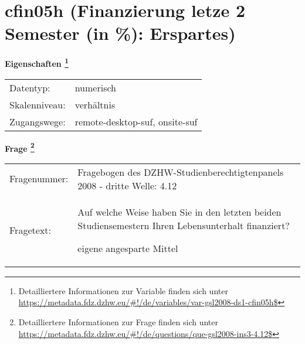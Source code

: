 
    \setcounter{footnote}{0}

    \vspace*{-1.8cm}
	\section{cfin05h (Finanzierung letze 2 Semester (in \%): Erspartes)}
	\label{section:cfin05h}



    \vspace*{0.5cm}
    \noindent\textbf{Eigenschaften
	\footnote{Detailliertere Informationen zur Variable finden sich unter
		\url{https://metadata.fdz.dzhw.eu/\#!/de/variables/var-gsl2008-ds1-cfin05h$}}}\\
	\begin{tabularx}{\hsize}{@{}lX}
	Datentyp: & numerisch \\
	Skalenniveau: & verhältnis \\
	Zugangswege: &
	  remote-desktop-suf, 
	  onsite-suf
 \\
    \end{tabularx}



				\vspace*{0.5cm}
                \noindent\textbf{Frage
	                \footnote{Detailliertere Informationen zur Frage finden sich unter
		              \url{https://metadata.fdz.dzhw.eu/\#!/de/questions/que-gsl2008-ins3-4.12$}}}\\
				\begin{tabularx}{\hsize}{@{}lX}
					Fragenummer: &
					  Fragebogen des DZHW-Studienberechtigtenpanels 2008 - dritte Welle:
					  4.12
 \\
					Fragetext: & Auf welche Weise haben Sie in den letzten beiden Studiensemestern Ihren Lebensunterhalt finanziert?\par  eigene angesparte Mittel \\
				\end{tabularx}





